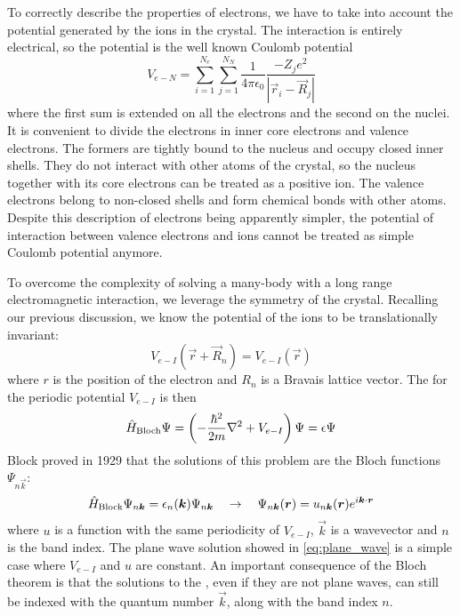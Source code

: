 To correctly describe the properties of electrons, we have to take into account the potential generated by the ions in the crystal. The interaction is entirely electrical, so the potential is the well known Coulomb potential
\begin{equation}
    V_{e-N} = \sum_{i=1}^{N_e} \sum_{j=1}^{N_N} \frac{1}{4\pi\epsilon_0} \frac{-Z_je^2}{|\vec{r}_i - \vec{R}_j|}
\end{equation}
where the first sum is extended on all the electrons and the second on the nuclei. It is convenient to divide the electrons in inner core electrons and valence electrons. The formers are tightly bound to the nucleus and occupy closed inner shells. They do not interact with other atoms of the crystal, so the nucleus together with its core electrons can be treated as a positive ion. The valence electrons belong to  non-closed shells and form chemical bonds with other atoms. Despite this description of electrons being apparently simpler, the potential of interaction between valence electrons and ions cannot be treated as simple Coulomb potential anymore.

To overcome the complexity of solving a many-body \sche   with a long range electromagnetic interaction, we leverage the symmetry of the crystal. Recalling our previous discussion, we know the potential of the ions to be translationally invariant:
\begin{equation}
    V_{e-I}(\vec{r}+\vec{R}_n) = V_{e-I}(\vec{r})
\end{equation}
where $r$ is the position of the electron and $R_n$ is a Bravais lattice vector.
The \sche for the periodic potential $V_{e-I}$ is then
\begin{equation}
    \oper{H}_\text{Bloch} \Psi = \left(-\frac{\hbar^2}{2m} \laplacian + V_{e-I} \right)\Psi = \epsilon\Psi
\end{equation}
Block proved in 1929 \cite{bloch1929} that the solutions of this problem are the Bloch functions $\Psi_{n\vec{k}}$:
\begin{equation}
    \hat{H}_\text{Block} \Psi_{n\mathbf{\boldsymbol{k}}} = \epsilon_n(\mathbf{\boldsymbol{k}}) \Psi_{n\mathbf{\boldsymbol{k}}}
    \quad
    \rightarrow
    \quad
    \Psi_{n\mathbf{\boldsymbol{k}}}(\mathbf{\boldsymbol{r}}) = u_{n\mathbf{\boldsymbol{k}}}(\mathbf{\boldsymbol{r}}) e^{i\mathbf{\boldsymbol{k}}\cdot\mathbf{\boldsymbol{r}}}
\end{equation}
where $u$ is a function with the same periodicity of $V_{e-I}$, $\vec{k}$ is a wavevector and $n$ is the band index. The plane wave solution showed in \cref{eq:plane_wave} is a simple case where $V_{e-I}$ and $u$ are constant. An important consequence of the Bloch theorem is that the solutions to the \sche, even if they are not plane waves, can still be indexed with the quantum number $\vec{k}$, along with the band index $n$.


